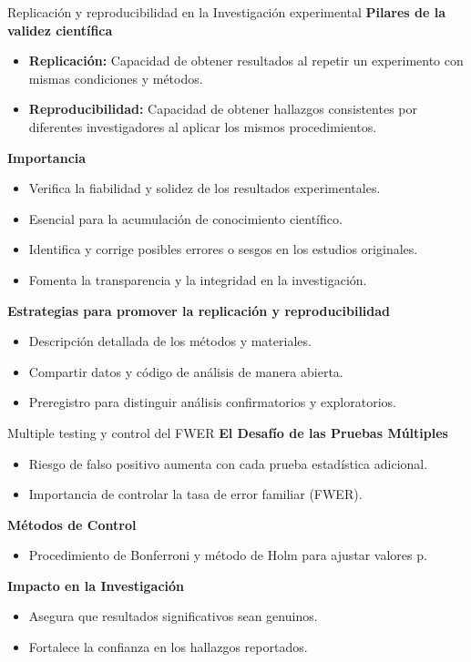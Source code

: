 ﻿\documentclass{beamer}
\begin{document}
\begin{frame}{Replicación y reproducibilidad en la Investigación experimental}
\textbf{Pilares de la validez científica}
\begin{itemize}
    \item \textbf{Replicación:} Capacidad de obtener resultados al repetir un experimento con mismas condiciones y métodos.
    \item \textbf{Reproducibilidad:} Capacidad de obtener hallazgos consistentes por diferentes investigadores al aplicar los mismos procedimientos.
\end{itemize}

\textbf{Importancia}
\begin{itemize}
    \item Verifica la fiabilidad y solidez de los resultados experimentales.
    \item Esencial para la acumulación de conocimiento científico.
    \item Identifica y corrige posibles errores o sesgos en los estudios originales.
    \item Fomenta la transparencia y la integridad en la investigación.
\end{itemize}

\textbf{Estrategias para promover la replicación y reproducibilidad}
\begin{itemize}
    \item Descripción detallada de los métodos y materiales.
    \item Compartir datos y código de análisis de manera abierta.
    \item Preregistro para distinguir análisis confirmatorios y exploratorios.
\end{itemize}
\end{frame}

\begin{frame}{Multiple testing y control del FWER}
    \textbf{El Desafío de las Pruebas Múltiples}
    \begin{itemize}
        \item Riesgo de falso positivo aumenta con cada prueba estadística adicional.
        \item Importancia de controlar la tasa de error familiar (FWER).
    \end{itemize}

    \textbf{Métodos de Control}
    \begin{itemize}
        \item Procedimiento de Bonferroni y método de Holm para ajustar valores p.
    \end{itemize}

    \textbf{Impacto en la Investigación}
    \begin{itemize}
        \item Asegura que resultados significativos sean genuinos.
        \item Fortalece la confianza en los hallazgos reportados.
    \end{itemize}
\end{frame}
\end{document}
